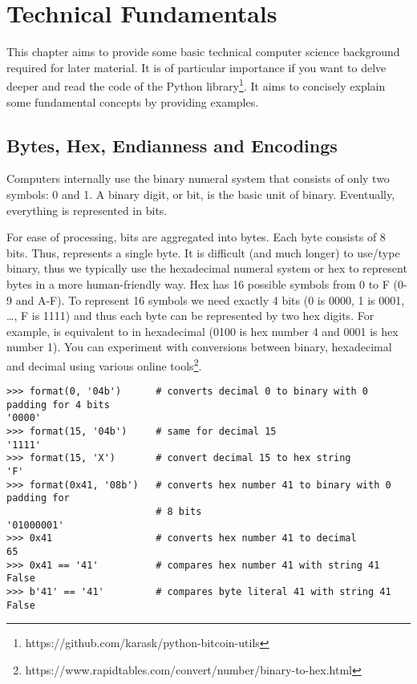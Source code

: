 \chapter{Technical Fundamentals}

\begin{summary}
This chapter aims to provide some basic technical computer science background required for later material. It is of particular importance if you want to delve deeper and read the code of the Python  library\footnote{https://github.com/karask/python-bitcoin-utils}. It aims to concisely explain some fundamental concepts by providing examples. 
\end{summary}

\section{Bytes, Hex, Endianness and Encodings}
Computers internally use the binary numeral system that consists of only two symbols: 0 and 1. A binary digit, or bit, is the basic unit of binary. Eventually, everything is represented in bits.

For ease of processing, bits are aggregated into bytes. Each byte consists of 8 bits. Thus,  represents a single byte. It is difficult (and much longer) to use/type binary, thus we typically use the hexadecimal numeral system or hex to represent bytes in a more human-friendly way. Hex has 16 possible symbols from 0 to F (0-9 and A-F). To represent 16 symbols we need exactly 4 bits (0 is 0000, 1 is 0001, …, F is 1111) and thus each byte can be represented by two hex digits. For example,  is equivalent to  in hexadecimal (0100 is hex number 4 and 0001 is hex number 1). You can experiment with conversions between binary, hexadecimal and decimal using various online tools\footnote{https://www.rapidtables.com/convert/number/binary-to-hex.html}.

\vspace{1em}
\begin{lstlisting}[style=Python,label={lst:encodings-1},caption={Python examples},captionpos=b]
>>> format(0, '04b')      # converts decimal 0 to binary with 0 padding for 4 bits
'0000'
>>> format(15, '04b')     # same for decimal 15
'1111'
>>> format(15, 'X')       # convert decimal 15 to hex string
'F'
>>> format(0x41, '08b')   # converts hex number 41 to binary with 0 padding for
                          # 8 bits
'01000001'
>>> 0x41                  # converts hex number 41 to decimal
65
>>> 0x41 == '41'          # compares hex number 41 with string 41
False
>>> b'41' == '41'         # compares byte literal 41 with string 41
False
\end{lstlisting}
\vspace{1em}


